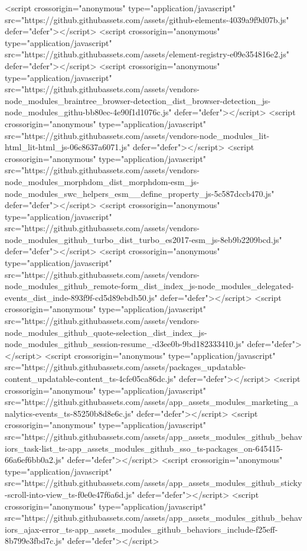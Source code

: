 <script crossorigin="anonymous" type="application/javascript" src="https://github.githubassets.com/assets/github-elements-4039a9f9d07b.js" defer="defer"></script>
<script crossorigin="anonymous" type="application/javascript" src="https://github.githubassets.com/assets/element-registry-e09e354816e2.js" defer="defer"></script>
<script crossorigin="anonymous" type="application/javascript" src="https://github.githubassets.com/assets/vendors-node_modules_braintree_browser-detection_dist_browser-detection_js-node_modules_githu-bb80ec-4e90f1d1076c.js" defer="defer"></script>
<script crossorigin="anonymous" type="application/javascript" src="https://github.githubassets.com/assets/vendors-node_modules_lit-html_lit-html_js-06c8637a6071.js" defer="defer"></script>
<script crossorigin="anonymous" type="application/javascript" src="https://github.githubassets.com/assets/vendors-node_modules_morphdom_dist_morphdom-esm_js-node_modules_swc_helpers_esm__define_property_js-5c587dccb470.js" defer="defer"></script>
<script crossorigin="anonymous" type="application/javascript" src="https://github.githubassets.com/assets/vendors-node_modules_github_turbo_dist_turbo_es2017-esm_js-8eb9b2209bcd.js" defer="defer"></script>
<script crossorigin="anonymous" type="application/javascript" src="https://github.githubassets.com/assets/vendors-node_modules_github_remote-form_dist_index_js-node_modules_delegated-events_dist_inde-893f9f-cd5d89ebdb50.js" defer="defer"></script>
<script crossorigin="anonymous" type="application/javascript" src="https://github.githubassets.com/assets/vendors-node_modules_github_quote-selection_dist_index_js-node_modules_github_session-resume_-d3ee0b-9bd182333410.js" defer="defer"></script>
<script crossorigin="anonymous" type="application/javascript" src="https://github.githubassets.com/assets/packages_updatable-content_updatable-content_ts-4cfe05ca86dc.js" defer="defer"></script>
<script crossorigin="anonymous" type="application/javascript" src="https://github.githubassets.com/assets/app_assets_modules_marketing_analytics-events_ts-85250b8d8e6c.js" defer="defer"></script>
<script crossorigin="anonymous" type="application/javascript" src="https://github.githubassets.com/assets/app_assets_modules_github_behaviors_task-list_ts-app_assets_modules_github_sso_ts-packages_on-645415-66a6ef6bb0a2.js" defer="defer"></script>
<script crossorigin="anonymous" type="application/javascript" src="https://github.githubassets.com/assets/app_assets_modules_github_sticky-scroll-into-view_ts-f0e0e47f6a6d.js" defer="defer"></script>
<script crossorigin="anonymous" type="application/javascript" src="https://github.githubassets.com/assets/app_assets_modules_github_behaviors_ajax-error_ts-app_assets_modules_github_behaviors_include-f25eff-8b799e3fbd7c.js" defer="defer"></script>

